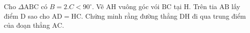 \begin{bt}
	Cho $\Delta \mathrm{ABC}$ có $B=2 . C<90^{\circ}$. Vẽ $\mathrm{AH}$ vuông góc vói $\mathrm{BC}$ tại $\mathrm{H}$. Trên tia $\mathrm{AB}$ lấy điểm $\mathrm{D}$ sao cho $\mathrm{AD}=\mathrm{HC}$. Chứng minh rằng đường thẳng $\mathrm{DH}$ đi qua trung điểm của đoạn thẳng $\mathrm{AC}$.
	\loigiai{}
\end{bt}

